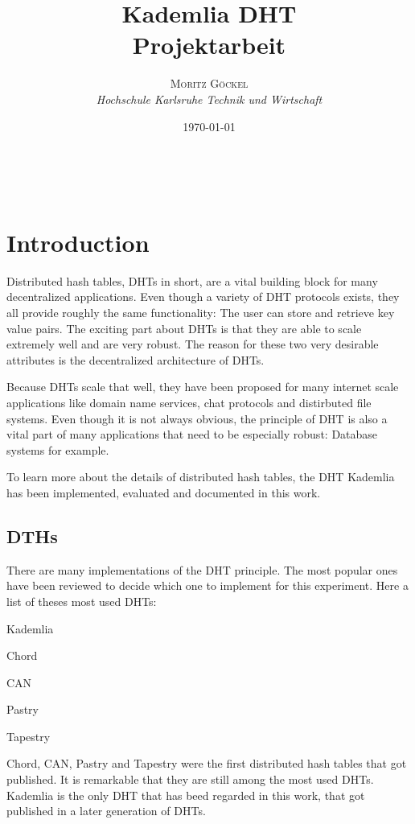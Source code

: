 \documentclass[a4paper, 12pt]{article} %
\title{\textbf{Kademlia DHT}\\ %
Projektarbeit} %
\author{\textsc{Moritz G\"ockel} %
\\{\textit{Hochschule Karlsruhe Technik und Wirtschaft}}} %
\date{\today}
\makeatletter
\renewcommand{\maketitle}{ 
\begin{flushright} %
{\LARGE\@title} %

\vspace{50pt} %

{\large\@author}
\\\@date 

\vspace{40pt}
\end{flushright}
}
\makeatother
\begin{document}
\maketitle

\vspace{30pt}

\newpage
\tableofcontents

\newpage
\section{Introduction}

Distributed hash tables, DHTs in short, are a vital building block for many decentralized applications. Even though a variety of DHT protocols exists, they all provide roughly the same functionality: The user can store and retrieve key value pairs. The exciting part about DHTs is that they are able to scale extremely well and are very robust. The reason for these two very desirable attributes is the decentralized architecture of DHTs.

Because DHTs scale that well, they have been proposed for many internet scale applications like domain name services, chat protocols and distirbuted file systems. Even though it is not always obvious, the principle of DHT is also a vital part of many applications that need to be especially robust: Database systems for example.

To learn more about the details of distributed hash tables, the DHT Kademlia has been implemented, evaluated and documented in this work.

\subsection{DTHs}

There are many implementations of the DHT principle. The most popular ones have been reviewed to decide which one to implement for this experiment. Here a list of theses most used DHTs:

\medskip
\begin{compactenum}
\item Kademlia
\item Chord
\item CAN
\item Pastry
\item Tapestry
\end{compactenum}
\medskip

Chord, CAN, Pastry and Tapestry were the first distributed hash tables that got published. It is remarkable that they are still among the most used DHTs. Kademlia is the only DHT that has beed regarded in this work, that got published in a later generation of DHTs.
\end{document}
